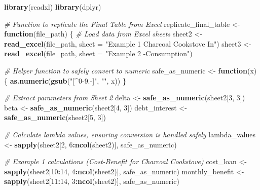 \documentclass[
]{article}
\newenvironment{Shaded}{\begin{snugshade}}{\end{snugshade}}
\newcommand{\AttributeTok}[1]{\textcolor[rgb]{0.13,0.29,0.53}{#1}}
\newcommand{\CommentTok}[1]{\textcolor[rgb]{0.56,0.35,0.01}{\textit{#1}}}
\newcommand{\ControlFlowTok}[1]{\textcolor[rgb]{0.13,0.29,0.53}{\textbf{#1}}}
\newcommand{\DecValTok}[1]{\textcolor[rgb]{0.00,0.00,0.81}{#1}}
\newcommand{\FunctionTok}[1]{\textcolor[rgb]{0.13,0.29,0.53}{\textbf{#1}}}
\newcommand{\NormalTok}[1]{#1}
\newcommand{\OtherTok}[1]{\textcolor[rgb]{0.56,0.35,0.01}{#1}}
\newcommand{\SpecialCharTok}[1]{\textcolor[rgb]{0.81,0.36,0.00}{\textbf{#1}}}
\newcommand{\StringTok}[1]{\textcolor[rgb]{0.31,0.60,0.02}{#1}}
\begin{document}
\begin{Shaded}
\begin{Highlighting}[]
\FunctionTok{library}\NormalTok{(readxl)}
\FunctionTok{library}\NormalTok{(dplyr)}

\CommentTok{\# Function to replicate the Final Table from Excel}
\NormalTok{replicate\_final\_table }\OtherTok{\textless{}{-}} \ControlFlowTok{function}\NormalTok{(file\_path) \{}
  \CommentTok{\# Load data from Excel sheets}
\NormalTok{  sheet2 }\OtherTok{\textless{}{-}} \FunctionTok{read\_excel}\NormalTok{(file\_path, }\AttributeTok{sheet =} \StringTok{"Example 1 Charcoal Cookstove In"}\NormalTok{)}
\NormalTok{  sheet3 }\OtherTok{\textless{}{-}} \FunctionTok{read\_excel}\NormalTok{(file\_path, }\AttributeTok{sheet =} \StringTok{"Example 2 {-}Consumption"}\NormalTok{)}
  
  \CommentTok{\# Helper function to safely convert to numeric}
\NormalTok{  safe\_as\_numeric }\OtherTok{\textless{}{-}} \ControlFlowTok{function}\NormalTok{(x) \{}
    \FunctionTok{as.numeric}\NormalTok{(}\FunctionTok{gsub}\NormalTok{(}\StringTok{"[\^{}0{-}9.{-}]"}\NormalTok{, }\StringTok{""}\NormalTok{, x))}
\NormalTok{  \}}
  
  \CommentTok{\# Extract parameters from Sheet 2}
\NormalTok{  delta }\OtherTok{\textless{}{-}} \FunctionTok{safe\_as\_numeric}\NormalTok{(sheet2[}\DecValTok{3}\NormalTok{, }\DecValTok{3}\NormalTok{])}
\NormalTok{  beta }\OtherTok{\textless{}{-}} \FunctionTok{safe\_as\_numeric}\NormalTok{(sheet2[}\DecValTok{4}\NormalTok{, }\DecValTok{3}\NormalTok{])}
\NormalTok{  debt\_interest }\OtherTok{\textless{}{-}} \FunctionTok{safe\_as\_numeric}\NormalTok{(sheet2[}\DecValTok{5}\NormalTok{, }\DecValTok{3}\NormalTok{])}
  
  \CommentTok{\# Calculate lambda values, ensuring conversion is handled safely}
\NormalTok{  lambda\_values }\OtherTok{\textless{}{-}} \FunctionTok{sapply}\NormalTok{(sheet2[}\DecValTok{2}\NormalTok{, }\DecValTok{6}\SpecialCharTok{:}\FunctionTok{ncol}\NormalTok{(sheet2)], safe\_as\_numeric)}
  
  \CommentTok{\# Example 1 calculations (Cost{-}Benefit for Charcoal Cookstove)}
\NormalTok{  cost\_loan }\OtherTok{\textless{}{-}} \FunctionTok{sapply}\NormalTok{(sheet2[}\DecValTok{10}\SpecialCharTok{:}\DecValTok{14}\NormalTok{, }\DecValTok{4}\SpecialCharTok{:}\FunctionTok{ncol}\NormalTok{(sheet2)], safe\_as\_numeric)}
\NormalTok{  monthly\_benefit }\OtherTok{\textless{}{-}} \FunctionTok{sapply}\NormalTok{(sheet2[}\DecValTok{11}\SpecialCharTok{:}\DecValTok{14}\NormalTok{, }\DecValTok{3}\SpecialCharTok{:}\FunctionTok{ncol}\NormalTok{(sheet2)], safe\_as\_numeric)}
  

\end{Highlighting}
\end{Shaded}
\end{document}
